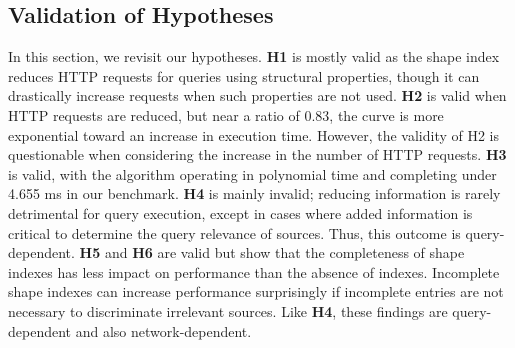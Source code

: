 \subsection{Validation of Hypotheses}
In this section, we revisit our hypotheses.
\textbf{H1} is mostly valid as the shape index reduces HTTP requests for queries using structural properties, though it can drastically increase requests when such properties are not used.
\textbf{H2} is valid when HTTP requests are reduced, but near a ratio of 0.83, the curve is more exponential toward an increase in execution time.
However, the validity of H2 is questionable when considering the increase in the number of HTTP requests.
\textbf{H3} is valid, with the algorithm operating in polynomial time and completing under 4.655 ms in our benchmark.
\textbf{H4} is mainly invalid; reducing information is rarely detrimental for query execution, except in cases where added information is critical to determine the query relevance of sources.
Thus, this outcome is query-dependent.
\textbf{H5} and \textbf{H6} are valid but show that the completeness of shape indexes has less impact on performance than the absence of indexes.
Incomplete shape indexes can increase performance surprisingly if incomplete entries are not necessary to discriminate irrelevant sources. 
Like \textbf{H4}, these findings are query-dependent and also network-dependent.

